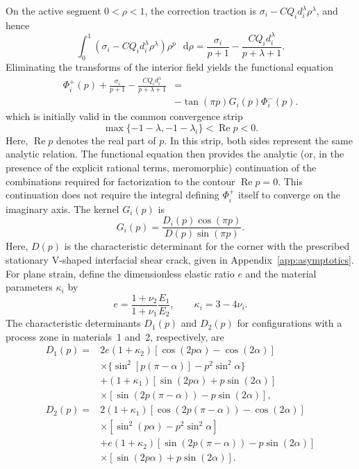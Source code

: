 \documentclass[pdflatex,iicol,sn-mathphys-ay]{sn-jnl}
\newcommand{\dd}{\mathop{}\!\mathrm{d}}
\begin{document}
On the active segment $0<\rho<1$, the correction traction is
$\sigma_i-CQ_i d_i^\lambda\rho^\lambda$, and hence
\begin{equation*}
  \int_0^1
  \left(\sigma_i-CQ_i d_i^\lambda\rho^\lambda\right)
  \rho^p\,\dd\rho
  =
  \frac{\sigma_i}{p+1}
  -\frac{CQ_i d_i^\lambda}{p+\lambda+1}.
\end{equation*}
Eliminating the transforms of the interior field yields the functional
equation
{\small
\begin{equation}
\label{eq:wiener-hopf-functional}
\begin{aligned}
  \Phi_i^+(p)
  +\frac{\sigma_i}{p+1}
  -\frac{CQ_i d_i^\lambda}{p+\lambda+1}
  &={}\\[-2pt]
  &-\tan(\pi p)G_i(p)\Phi_i^-(p).
\end{aligned}
\end{equation}
}
which is initially valid in the common convergence strip
\begin{equation*}
  \max\{-1-\lambda,-1-\lambda_i\}
  <\operatorname{Re}p<0.
\end{equation*}
Here, $\operatorname{Re}p$ denotes the real part of $p$. In this strip,
both sides represent the same analytic relation. The functional equation then provides the analytic (or, in the presence of
the explicit rational terms, meromorphic) continuation of the combinations
required for factorization to the contour $\operatorname{Re}p=0$. This
continuation does not require the integral defining $\Phi_i^+$ itself to
converge on the imaginary axis. The
kernel $G_i(p)$ is
\begin{equation*}
  G_i(p)=\frac{D_i(p)\cos(\pi p)}{D(p)\sin(\pi p)}.
\end{equation*}
Here, $D(p)$ is the characteristic determinant for the corner with the
prescribed stationary V-shaped interfacial shear crack, given in
Appendix~\ref{app:asymptotics}.
For plane strain, define the dimensionless elastic ratio $e$ and the
material parameters $\kappa_i$ by
\begin{equation*}
  e=\frac{1+\nu_2}{1+\nu_1}\frac{E_1}{E_2},
  \qquad
  \kappa_i=3-4\nu_i.
\end{equation*}
The characteristic determinants $D_1(p)$ and $D_2(p)$ for configurations
with a process zone in materials~1 and~2, respectively, are
\begin{equation*}
\begin{aligned}
  D_1(p)={}&2e(1+\kappa_2)
    [\cos(2p\alpha)-\cos(2\alpha)]\\
  &\times\{\sin^2[p(\pi-\alpha)]-p^2\sin^2\alpha\}\\
  &+(1+\kappa_1)
    [\sin(2p\alpha)+p\sin(2\alpha)]\\
  &\times[\sin(2p(\pi-\alpha))-p\sin(2\alpha)],\\[2pt]
  D_2(p)={}&2(1+\kappa_1)
    [\cos(2p(\pi-\alpha))-\cos(2\alpha)]\\
  &\times[\sin^2(p\alpha)-p^2\sin^2\alpha]\\
  &+e(1+\kappa_2)
    [\sin(2p(\pi-\alpha))-p\sin(2\alpha)]\\
  &\times[\sin(2p\alpha)+p\sin(2\alpha)].
\end{aligned}
\end{equation*}
\end{document}
